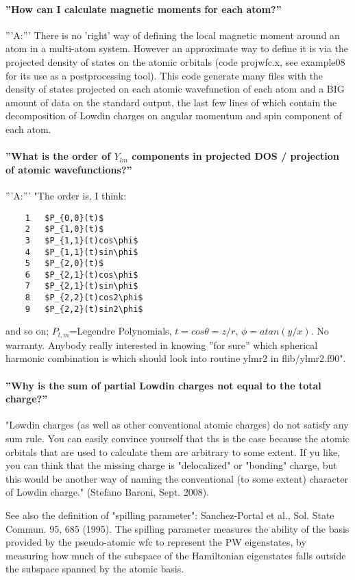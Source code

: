 \documentclass[12pt,a4paper]{article}
\begin{document}
\paragraph{ ''How can I calculate magnetic moments for each atom?''} 
'''A:''' There is no 'right' way of defining the local magnetic moment
around an atom in a multi-atom system. However an approximate way to define
it is via the projected density of states on the atomic orbitals (code
projwfc.x, see example08 for its use as a postprocessing tool). This
code generate many files with the density of states projected on each
atomic wavefunction of each atom and a BIG amount of data on the
standard output, the last few lines of which contain the decomposition
of Lowdin charges on angular momentum and spin component of each atom.

\paragraph{ ''What is the order of $Y_{lm}$ components in projected
  DOS / projection of atomic wavefunctions?''} 
'''A:''' "The order is, I think:
\begin{verbatim}
    1   $P_{0,0}(t)$
    2   $P_{1,0}(t)$
    3   $P_{1,1}(t)cos\phi$
    4   $P_{1,1}(t)sin\phi$ 
    5   $P_{2,0}(t)$
    6   $P_{2,1}(t)cos\phi$ 
    7   $P_{2,1}(t)sin\phi$
    8   $P_{2,2}(t)cos2\phi$
    9   $P_{2,2}(t)sin2\phi$
\end{verbatim}
and so on; $P_{l,m}$=Legendre Polynomials, $t = cos\theta = z/r$, 
$\phi= atan(y /x)$. No warranty. Anybody really interested in knowing 
''for sure'' which spherical harmonic combination is which should look 
into routine ylmr2 in flib/ylmr2.f90". 

\paragraph{ ''Why is the sum of partial Lowdin charges not equal to
  the total charge?''} 

"Lowdin charges (as well as other conventional atomic charges) do not
satisfy any sum rule. You can easily convince yourself that ths is the
case because the atomic orbitals that are used to calculate them are
arbitrary to some extent. If yu like, you can think that the missing
charge is "delocalized" or "bonding" charge, but this would be another
way of naming the conventional (to some extent) character of Lowdin
charge." (Stefano Baroni, Sept. 2008).  

See also the definition of "spilling parameter": Sanchez-Portal et
al., Sol. State Commun. 95, 685 (1995). The spilling parameter
measures the ability of the basis provided by the pseudo-atomic wfc to
represent the PW eigenstates, by measuring how much of the subspace of
the Hamiltonian eigenstates falls outside the subspace spanned by the
atomic basis. 
\end{document}
